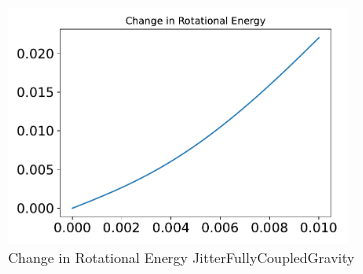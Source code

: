 \begin{figure}[htbp]\centerline{\includegraphics[width=0.80\textwidth]{AutoTeX/ChangeInRotationalEnergyJitterFullyCoupledGravity}}\caption{Change in Rotational Energy JitterFullyCoupledGravity}\label{fig:ChangeInRotationalEnergyJitterFullyCoupledGravity}\end{figure}